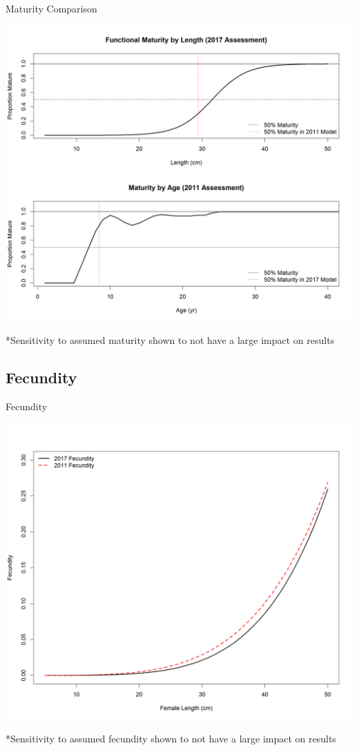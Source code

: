 \documentclass[pdf]{beamer}\usepackage[]{graphicx}\usepackage[]{color}
\begin{document}
\begin{frame}{Maturity Comparison}
  \begin{center}
    \includegraphics[scale = 0.3]{figures/Maturity_Comparison.png}
  \end{center}
  *Sensitivity to assumed maturity shown to not have a large impact on results
\end{frame}

\subsection{Fecundity}
\begin{frame}{Fecundity}
  \begin{center}
    \includegraphics[scale = 0.3, trim={0, 0, 1cm, 1cm}, clip]{figures/Fecundity_Comparison.png}
  \end{center}
  *Sensitivity to assumed fecundity shown to not have a large impact on results
\end{frame}
\end{document}
